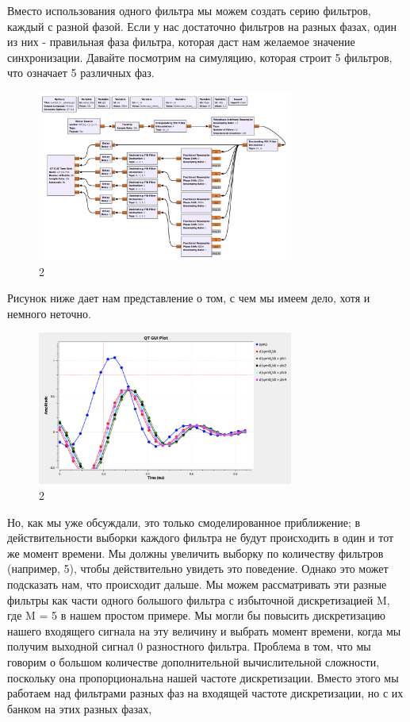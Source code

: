 \documentclass[10pt,a4paper,oneside]{article}
\begin{document}
Вместо использования одного фильтра мы можем создать серию фильтров, каждый с разной фазой. Если у нас достаточно фильтров на разных фазах, один из них - правильная фаза фильтра, которая даст нам желаемое значение синхронизации. Давайте посмотрим на симуляцию, которая строит 5 фильтров, что означает 5 различных фаз.

\begin{figure}[H]
        \centering
        \includegraphics[width=0.75\textwidth]{pics/13.png}
        \caption{2}
        \label{fig:first}
\end{figure}

Рисунок ниже дает нам представление о том, с чем мы имеем дело, хотя и немного неточно.

\begin{figure}[H]
        \centering
        \includegraphics[width=0.75\textwidth]{pics/14.png}
        \caption{2}
        \label{fig:first}
\end{figure}

Но, как мы уже обсуждали, это только смоделированное приближение; в действительности выборки каждого фильтра не будут происходить в один и тот же момент времени. Мы должны увеличить выборку по количеству фильтров (например, 5), чтобы действительно увидеть это поведение. Однако это может подсказать нам, что происходит дальше. Мы можем рассматривать эти разные фильтры как части одного большого фильтра с избыточной дискретизацией M, где M = 5 в нашем простом примере. Мы могли бы повысить дискретизацию нашего входящего сигнала на эту величину и выбрать момент времени, когда мы получим выходной сигнал 0 разностного фильтра. Проблема в том, что мы говорим о большом количестве дополнительной вычислительной сложности, поскольку она пропорциональна нашей частоте дискретизации. Вместо этого мы работаем над фильтрами разных фаз на входящей частоте дискретизации, но с их банком на этих разных фазах,
\end{document}
